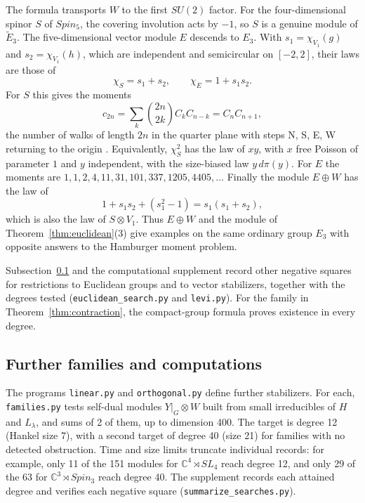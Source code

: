\documentclass[11pt,reqno]{amsart}
\theoremstyle{definition}
\newcommand{\CC}{\mathbb C}
\begin{document}
The formula transports $W$ to the first $SU(2)$ factor. For the four-dimensional spinor $S$ of $Spin_5$, the covering involution acts by $-1$, so $S$ is a genuine module of $\widetilde E_3$. The five-dimensional vector module $E$ descends to $E_3$. With $s_1=\chi_{V_1}(g)$ and $s_2=\chi_{V_1}(h)$, which are independent and semicircular on $[-2,2]$, their laws are those of
\[
   \chi_S=s_1+s_2,\qquad \chi_E=1+s_1s_2 .
\]
For $S$ this gives the moments
\[
   c_{2n}=\sum_k\binom{2n}{2k}C_kC_{n-k}=C_nC_{n+1} ,
\]
the number of walks of length $2n$ in the quarter plane with steps N, S, E, W returning to the origin \cite{GKS}. Equivalently, $\chi_S^2$ has the law of $xy$, with $x$ free Poisson of parameter $1$ and $y$ independent, with the size-biased law $y\,d\pi(y)$. For $E$ the moments are $1,1,2,4,11,31,101,337,1205,4405,\ldots$ Finally the module $E\oplus W$ has the law of
\[
   1+s_1s_2+(s_1^2-1)=s_1(s_1+s_2) ,
\]
which is also the law of $S\otimes V_1$. Thus $E\oplus W$ and the module of Theorem~\ref{thm:euclidean}(3) give examples on the same ordinary group $E_3$ with opposite answers to the Hamburger moment problem.

Subsection~\ref{sec:further} and the computational supplement record other negative squares for restrictions to Euclidean groups and to vector stabilizers, together with the degrees tested (\texttt{euclidean\_search.py} and \texttt{levi.py}). For the family in Theorem~\ref{thm:contraction}, the compact-group formula proves existence in every degree.

\subsection{Further families and computations}\label{sec:further}
The programs \texttt{linear.py} and \texttt{orthogonal.py} define further stabilizers. For each, \texttt{families.py} tests self-dual modules $Y|_G\otimes W$ built from small irreducibles of $H$ and $L_\lambda$, and sums of 2 of them, up to dimension 400. The target is degree 12 (Hankel size 7), with a second target of degree 40 (size 21) for families with no detected obstruction. Time and size limits truncate individual records: for example, only 11 of the 151 modules for $\CC^4\rtimes SL_4$ reach degree 12, and only 29 of the 63 for $\CC^3\rtimes Spin_3$ reach degree 40. The supplement records each attained degree and verifies each negative square (\texttt{summarize\_searches.py}).
\end{document}
